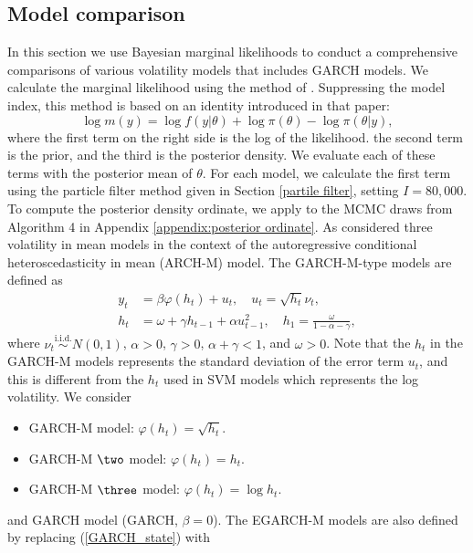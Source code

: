 \subsection{Model comparison}
\label{sec:alternative-models}
In this section we use Bayesian marginal likelihoods to conduct a comprehensive comparisons of various volatility models that includes GARCH models. We calculate the marginal likelihood using the method of \cite{Chib(95)}. Suppressing the model index, this method is based on an identity introduced in that paper: 
\begin{equation*}
    \log m(y) = \log f(y|\theta) + \log \pi(\theta) - \log \pi(\theta|y), 
\end{equation*}
where the first term on the right side is the log of the likelihood. the second term is the prior, and the third is the posterior density. We evaluate each of these terms with the posterior mean of $\theta$.
For each model, we calculate the first term using the particle filter method given in Section \ref{partile filter}, setting $I = 80,000$. To compute the posterior density ordinate, we apply \cite{ChibJeliazkov(01)} to the MCMC draws from Algorithm 4 in Appendix \ref{appendix:posterior ordinate}.
As \cite{EngelLilienRobins(87)} considered three volatility in mean models in the context of the autoregressive conditional heteroscedasticity in mean (ARCH-M) model. The GARCH-M-type models are defined as
\begin{align}
    y_t &= \beta \varphi(h_t) + u_t, \quad
    u_t = \sqrt{h_t} \nu_t,\\
    h_t &= \omega + \gamma h_{t-1} + \alpha u_{t-1}^2, \quad
    h_1 = \frac{\omega}{1 - \alpha - \gamma}, \label{GARCH_state}
\end{align}
where $\nu_t \overset{\text{i.i.d.}}{\sim} N(0,1)$, $\alpha > 0$, $\gamma > 0$, $\alpha + \gamma < 1$, and $\omega > 0$. 
Note that the $h_t$ in the GARCH-M models represents the standard deviation of the error term $u_t$, and this is different from the $h_t$ used in SVM models which represents the log volatility.
We consider 
\begin{itemize}
    \item GARCH-M model: $\varphi(h_t) = \sqrt{h_t}$. 
    \item GARCH-M $\two$ model: $\varphi(h_t) = h_t$.
    \item GARCH-M $\three$ model: $\varphi(h_t) = \log h_t$.
\end{itemize}
and 
GARCH model (GARCH, $\beta=0$). 
The EGARCH-M models are also defined by replacing (\ref{GARCH_state}) with

